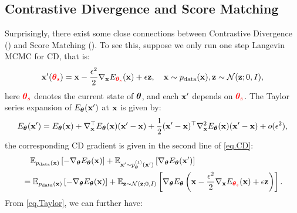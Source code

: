 \documentclass{article}
\begin{document}
\subsection{Contrastive Divergence and Score Matching}
Surprisingly, there exist some close connections \citep{hyvarinen2007connections} between Contrastive Divergence () and Score Matching (). To see this, suppose we only run one step Langevin MCMC for CD, that is:
\begin{equation}
    {\mathbf{x}}'(\textcolor{red}{{\bm{\theta}}_s}) = {\mathbf{x}} - \frac{\epsilon^2}{2}\nabla_{\mathbf{x}} E_{\textcolor{red}{{\bm{\theta}}_s}}({\mathbf{x}}) + \epsilon {\mathbf{z}}, \quad {\mathbf{x}} \sim p_{\rm{data}}({\mathbf{x}}), {\mathbf{z}} \sim \mathcal{N}({\mathbf{z}}; 0, I),
\end{equation}
here $\textcolor{red}{{\bm{\theta}}_s}$ denotes the current state of ${\bm{\theta}}$, and each ${\mathbf{x}}'$ depends on $\textcolor{red}{{\bm{\theta}}_s}$. The Taylor series expansion of $E_{\bm{\theta}}({\mathbf{x}}')$ at ${\mathbf{x}}$ is given by:
\begin{equation}\label{eq.Taylor}
    E_{\bm{\theta}}({\mathbf{x}}') = E_{\bm{\theta}}({\mathbf{x}}) + \nabla_{\mathbf{x}}^\top E_{\bm{\theta}}({\mathbf{x}}) ({\mathbf{x}}'- {\mathbf{x}}) + \frac{1}{2}({\mathbf{x}}'- {\mathbf{x}})^\top \nabla_{\mathbf{x}}^2 E_{\bm{\theta}}({\mathbf{x}}) ({\mathbf{x}}'- {\mathbf{x}}) + o(\epsilon^2),
\end{equation}
the corresponding CD gradient is given in the second line of \eqref{eq.CD}:
\begin{equation}
    \begin{aligned}
        &\quad \mathbb{E}_{p_{\rm{data}}({\mathbf{x}})}\left[ -\nabla_{\bm{\theta}} E_{\bm{\theta}}({\mathbf{x}}) \right] + \mathbb{E}_{{{\mathbf{x}}'} \sim p^{(1)}_{{\bm{\theta}}}({\mathbf{x}}')}\left[ \nabla_{\bm{\theta}} E_{\bm{\theta}}({\mathbf{x}}') \right] \\
        &= \mathbb{E}_{p_{\rm{data}}({\mathbf{x}})}\left[ -\nabla_{\bm{\theta}} E_{\bm{\theta}}({\mathbf{x}}) \right] + \mathbb{E}_{{\mathbf{z}} \sim \mathcal{N}({\mathbf{z}}; 0, I)}\left[ \nabla_{\bm{\theta}} E_{\bm{\theta}}\left({\mathbf{x}} - \frac{\epsilon^2}{2}\nabla_{\mathbf{x}} E_{\textcolor{red}{{\bm{\theta}}_s}}({\mathbf{x}}) + \epsilon {\mathbf{z}} \right) \right].
    \end{aligned}
\end{equation}
From \eqref{eq.Taylor}, we can further have:
\end{document}
